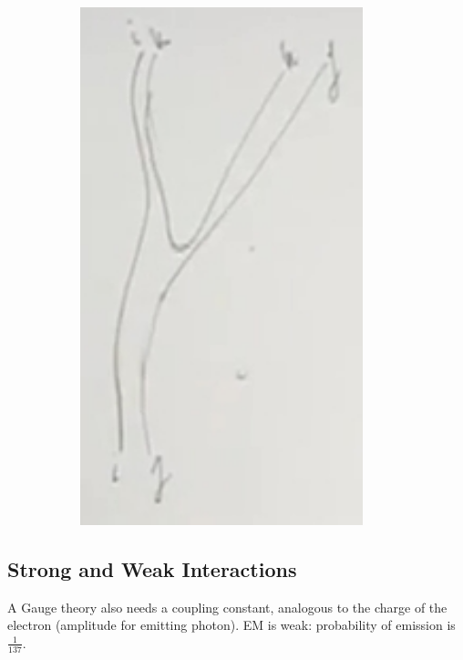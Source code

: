 \documentclass[]{article}
\begin{document}
\begin{figure}[H]
\begin{subfigure}[t]{0.45\textwidth}
		\includegraphics[width=0.9\textwidth]{2-5-gluon-gluon.jpg}
	\end{subfigure}
\end{figure}

\subsection{Strong and Weak Interactions}

A Gauge theory also needs a coupling constant, analogous to the charge of the electron (amplitude for emitting photon). EM is weak: probability of emission is $\frac{1}{137}$.
\end{document}

